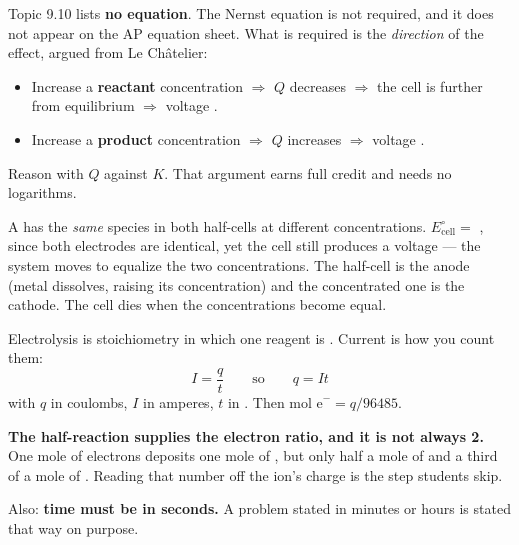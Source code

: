 \documentclass{apchem-notes}
\begin{document}
\begin{apcnote}
Topic 9.10 lists \textbf{no equation}. The Nernst equation is not required,
and it does not appear on the AP equation sheet. What is required is the
\emph{direction} of the effect, argued from Le Ch\^atelier:

\begin{itemize}[leftmargin=*,itemsep=0.2em]
  \item Increase a \textbf{reactant} concentration $\Rightarrow$ $Q$
        decreases $\Rightarrow$ the cell is further from equilibrium
        $\Rightarrow$ voltage .
  \item Increase a \textbf{product} concentration $\Rightarrow$ $Q$
        increases $\Rightarrow$ voltage .
\end{itemize}

Reason with $Q$ against $K$. That argument earns full credit and needs no
logarithms.
\end{apcnote}

A  has the \emph{same} species in both half-cells
at different concentrations. $E^\circ_{\text{cell}} = $
, since both electrodes are identical, yet the cell
still produces a voltage --- the system moves to equalize the two
concentrations. The  half-cell is the anode
(metal dissolves, raising its concentration) and the concentrated one is
the cathode. The cell dies when the concentrations become equal.



Electrolysis is stoichiometry in which one reagent is
. Current is how you count them:
\[ I = \frac{q}{t} \qquad\text{so}\qquad q = It \]
with $q$ in coulombs, $I$ in amperes, $t$ in
. Then
$\text{mol e}^- = q/96485$.

\begin{center}
\end{center}

\begin{apctrap}
\textbf{The half-reaction supplies the electron ratio, and it is not always
2.} One mole of electrons deposits one mole of , but only half a
mole of  and a third of a mole of . Reading that number off
the ion's charge is the step students skip.

Also: \textbf{time must be in seconds.} A problem stated in minutes or
hours is stated that way on purpose.
\end{apctrap}
\end{document}
